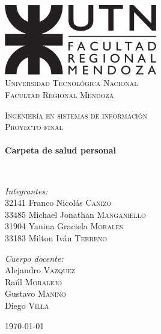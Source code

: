 \begin{titlepage}
\begin{center}

\includegraphics[width=0.5\textwidth]{./img/utn_logo}~\\[1cm]

{
\textsc{\LARGE Universidad Tecnológica Nacional\\
Facultad Regional Mendoza}\\[1.0cm]
}

\textsc{\Large Ingeniería en sistemas de información}\\[0.5cm]

\textsc{\large Proyecto final}\\[0.5cm]

\HRule \\[0.4cm]
{ \huge \bfseries Carpeta de salud personal \\[0.4cm] }

\HRule \\[1.5cm]

\noindent
\begin{minipage}[t]{0.7\textwidth}
\begin{flushleft} \large
\emph{Integrantes:}\\
{\scriptsize 32141} Franco Nicolás \textsc{Canizo}\\
{\scriptsize 33485} Michael Jonathan \textsc{Manganiello}\\
{\scriptsize 31904} Yanina Graciela \textsc{Morales}\\
{\scriptsize 33183} Milton Iván \textsc{Terreno}
\end{flushleft}
\end{minipage}%
\begin{minipage}[t]{0.3\textwidth}
\begin{flushright} \large
\emph{Cuerpo docente:} \\
Alejandro \textsc{Vazquez}\\
Raúl \textsc{Moralejo}\\
Gustavo \textsc{Manino}\\
Diego \textsc{Villa}
\end{flushright}
\end{minipage}

\vfill

{\large \today}

\end{center}
\end{titlepage}